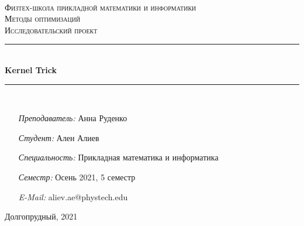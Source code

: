 \begin{titlepage}
\thispagestyle{empty}
\newcommand{\HRule}{\rule{\linewidth}{0.5mm}}
\hspace{1cm}
\center

\small
\textsc{\Large {}}\\[2.0cm]
\textsc{\large Физтех-школа прикладной математики и информатики}\\[0.8cm]
\MSonehalfspacing
\textsc{\large Методы оптимизаций \\ Исследовательский проект}\\[1.0cm]

\newcommand{\coursename}{Методы оптимизаций 3 к. 5 с.}



\HRule\\[1cm]
{ \Large \bfseries Kernel Trick}\\[1cm]
\HRule \\[2.4cm]
\MSonehalfspacing

\begin{minipage}[t]{0.8\textwidth}
	\begin{itemize}
	\item[\emph{Преподаватель:}] Анна Руденко
	\item[\emph{Студент:}] Ален Алиев
	\item[\emph{Специальность:}] Прикладная математика и информатика
	\item[\emph{Семестр:}] Осень 2021, 5 семестр
	\item[\emph{E-Mail:}] aliev.ae@phystech.edu
	\end{itemize}
\end{minipage}

\vspace{2.9cm}
\centering
Долгопрудный, 2021
\end{titlepage}
\restoregeometry


